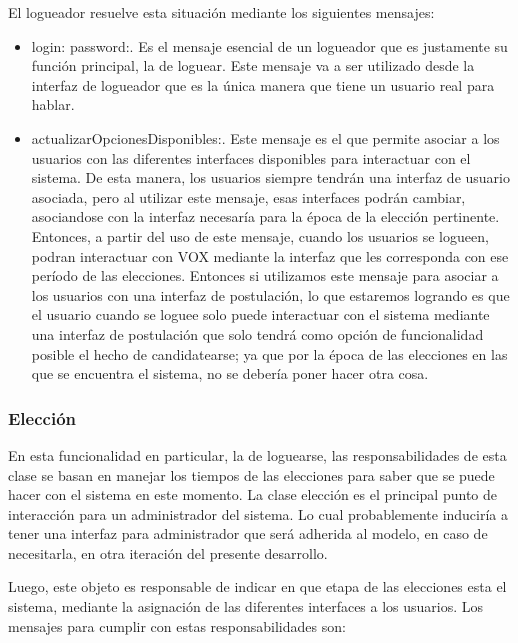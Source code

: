 El logueador resuelve esta situaci\'on mediante los siguientes mensajes:

\begin{itemize}
\item login: password:. Es el mensaje esencial de un logueador que es justamente su funci\'on principal, la de loguear. Este mensaje va a ser utilizado desde la interfaz de logueador que es la \'unica manera que tiene un usuario real para hablar.
\item actualizarOpcionesDisponibles:. Este mensaje es el que permite asociar a los usuarios con las diferentes interfaces disponibles para interactuar con el sistema. De esta manera, los usuarios siempre tendr\'an una interfaz de usuario asociada, pero al utilizar este mensaje, esas interfaces podr\'an cambiar, asociandose con la interfaz necesar\'ia para la \'epoca de la elecci\'on pertinente. Entonces, a partir del uso de este mensaje, cuando los usuarios se logueen, podran interactuar con VOX mediante la interfaz que les corresponda con ese per\'iodo de las elecciones. Entonces si utilizamos este mensaje para asociar a los usuarios con una interfaz de postulaci\'on, lo que estaremos logrando es que el usuario cuando se loguee solo puede interactuar con el sistema mediante una interfaz de postulaci\'on que solo tendr\'a como opci\'on de funcionalidad posible el hecho de candidatearse; ya que por la \'epoca de las elecciones en las que se encuentra el sistema, no se deber\'ia poner hacer otra cosa.
\end{itemize}

\subsubsection{Elecci\'on}

En esta funcionalidad en particular, la de loguearse, las responsabilidades de esta clase se basan en manejar los tiempos de las elecciones para saber que se puede hacer con el sistema en este momento. La clase elecci\'on es el principal punto de interacci\'on para un administrador del sistema. Lo cual probablemente inducir\'ia a tener una interfaz para administrador que ser\'a adherida al modelo, en caso de necesitarla, en otra iteraci\'on del presente desarrollo.

Luego, este objeto es responsable de indicar en que etapa de las elecciones esta el sistema, mediante la asignaci\'on de las diferentes interfaces a los usuarios. Los mensajes para cumplir con estas responsabilidades son:

